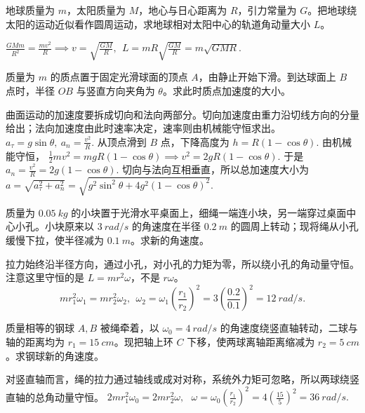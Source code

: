 \documentclass[lang=cn,11pt]{elegantbook}
\begin{document}
\begin{exercise}
地球质量为 \(m\)，太阳质量为 \(M\)，地心与日心距离为 \(R\)，引力常量为 \(G\)。把地球绕太阳的运动近似看作圆周运动，求地球相对太阳中心的轨道角动量大小 \(L\)。
\end{exercise}
\begin{solution}
 \(\frac{GMm}{R^2}=\frac{mv^2}{R} \implies v=\sqrt{\frac{GM}{R}},~~L=mR\sqrt{\frac{GM}{R}} =m\sqrt{GMR}.\) 
\end{solution}


\begin{exercise}
质量为 \(m\) 的质点置于固定光滑球面的顶点 \(A\)，由静止开始下滑。到达球面上 \(B\) 点时，半径 \(OB\) 与竖直方向夹角为 \(\theta\)。求此时质点加速度的大小。
\end{exercise}

\begin{solution}
曲面运动的加速度要拆成切向和法向两部分。切向加速度由重力沿切线方向的分量给出；法向加速度由此时速率决定，速率则由机械能守恒求出。
 \(a_\tau=g\sin\theta,~a_n=\frac{v^2}{R}.\) 
从顶点滑到 \(B\) 点，下降高度为
 \(h=R(1-\cos\theta).\) 
由机械能守恒，
 \(\frac12 mv^2=mgR(1-\cos\theta) \implies v^2=2gR(1-\cos\theta).\) 
于是
 \(a_n=\frac{v^2}{R}=2g(1-\cos\theta).\) 
切向与法向互相垂直，所以总加速度大小为
 \(a=\sqrt{a_\tau^2+a_n^2} =\sqrt{g^2\sin^2\theta+4g^2(1-\cos\theta)^2}.\) 
\end{solution}


\begin{exercise}
质量为 \(\SI{0.05}{kg}\) 的小块置于光滑水平桌面上，细绳一端连小块，另一端穿过桌面中心小孔。小块原来以 \(\SI{3}{rad/s}\) 的角速度在半径 \(\SI{0.2}{m}\) 的圆周上转动；现将绳从小孔缓慢下拉，使半径减为 \(\SI{0.1}{m}\)。求新的角速度。
\end{exercise}
\begin{solution}
拉力始终沿半径方向，通过小孔，对小孔的力矩为零，所以绕小孔的角动量守恒。注意这里守恒的是 \(L=mr^2\omega\)，不是 \(r\omega\)。
\[
mr_1^2\omega_1=mr_2^2\omega_2,~~\omega_2=\omega_1\left(\frac{r_1}{r_2}\right)^2
=3\left(\frac{0.2}{0.1}\right)^2
=\SI{12}{rad/s}.
\]
\end{solution}

\begin{exercise}
质量相等的钢球 \(A,B\) 被绳牵着，以 \(\omega_0=\SI{4}{rad/s}\) 的角速度绕竖直轴转动，二球与轴的距离均为 \(r_1=\SI{15}{cm}\)。现把轴上环 \(C\) 下移，使两球离轴距离缩减为 \(r_2=\SI{5}{cm}\)。求钢球新的角速度。
\end{exercise}
\begin{solution}
对竖直轴而言，绳的拉力通过轴线或成对对称，系统外力矩可忽略，所以两球绕竖直轴的总角动量守恒。
 \(2mr_1^2\omega_0=2mr_2^2\omega,~~~ \omega=\omega_0\left(\frac{r_1}{r_2}\right)^2 =4\left(\frac{15}{5}\right)^2 =\SI{36}{rad/s}.\) 
\end{solution}
\end{document}
